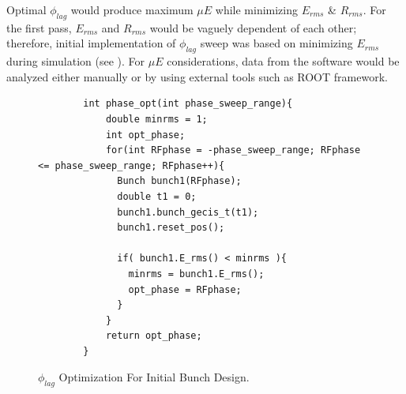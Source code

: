 \documentclass[a4paper,oneside,12pt]{report}
\numberwithin{equation}{chapter}
\begin{document}
Optimal $\phi_{lag}$ would produce maximum $\mu E$ while minimizing $E_{rms}$ \& $R_{rms}$. For the first pass, 
$E_{rms}$ and $R_{rms}$ would be vaguely dependent of each other; therefore, initial implementation of $\phi_{lag}$ sweep was based on minimizing $E_{rms}$ during simulation (see ). 
For $\mu E$ considerations, data from the software would be analyzed either manually or by using external tools such as ROOT framework. 
\vspace{20pt}
\begin{figure}[H]
    \centering
    \begin{verbatim}
        int phase_opt(int phase_sweep_range){
            double minrms = 1;
            int opt_phase;
            for(int RFphase = -phase_sweep_range; RFphase <= phase_sweep_range; RFphase++){
              Bunch bunch1(RFphase);
              double t1 = 0;
              bunch1.bunch_gecis_t(t1);
              bunch1.reset_pos();
        
              if( bunch1.E_rms() < minrms ){
                minrms = bunch1.E_rms();
                opt_phase = RFphase;
              }
            }
            return opt_phase;
        }
    \end{verbatim}
    \vspace{20pt}
    \caption{$\phi_{lag}$ Optimization For Initial Bunch Design.}
    \label{fig:phlag_opt}
\end{figure}
\clearpage
\end{document}
